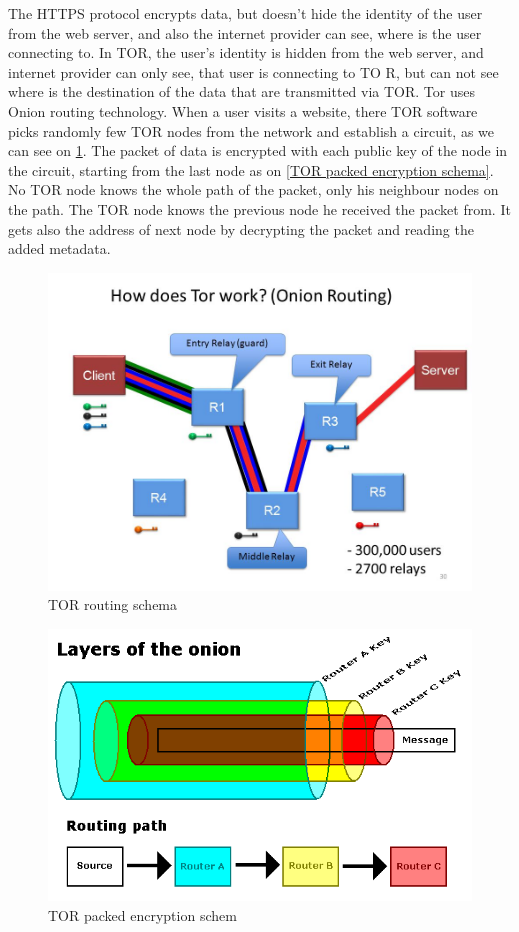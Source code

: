 \documentclass[
  digital, %
  table,   %
  lof,     %
  lot,     %
  oneside
]{fithesis3}
\begin{document}
The HTTPS protocol encrypts data, but doesn't hide the identity of the user from the web server,
 and also the internet provider can see, where is the user connecting to.
 In TOR, the user's identity is hidden from the web server, and internet provider can only see, that user is connecting to TO
R, but can not see where is the destination of the data that are transmitted via TOR.
 Tor uses Onion routing technology. When a user visits a website, there TOR software picks randomly few TOR nodes from the network and establish a circuit, as we can see on \ref{TOR routing schema}. 
 The packet of data is encrypted with each public key of the node in the circuit, starting from the last node as on \ref{TOR
 packed encryption schema}.
 No TOR node knows the whole path of the packet, only his neighbour nodes on the path.
 The TOR node knows the previous node he received the packet from. It gets also the address 
 of next node by decrypting the packet and reading the added metadata.
 
 \begin{figure}[!htb]
    \centering
    \includegraphics[width=1\textwidth]{tor-prejate}
    \caption{TOR routing schema}
    \label{TOR routing schema}
\end{figure}
 
  \begin{figure}[!htb]
    \centering
    \includegraphics[width=1\textwidth]{tor-packet-prejate}
    \caption{TOR packed encryption schem}
    \label{TOR packed encryption schema}
\end{figure}
 
\end{document}
